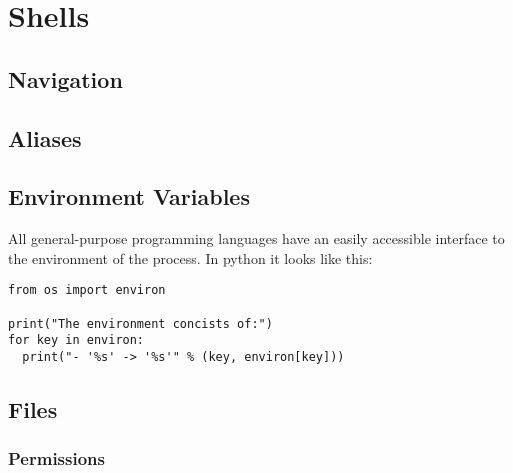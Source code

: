\section{Shells}

\subsection{Navigation}


\subsection{Aliases}



\subsection{Environment Variables}


All general-purpose programming languages have an easily accessible interface to the environment of the process. In python it looks like this:
\begin{verbatim}
from os import environ

print("The environment concists of:")
for key in environ:
  print("- '%s' -> '%s'" % (key, environ[key]))
\end{verbatim}


\subsection{Files}

\subsubsection{Permissions}

